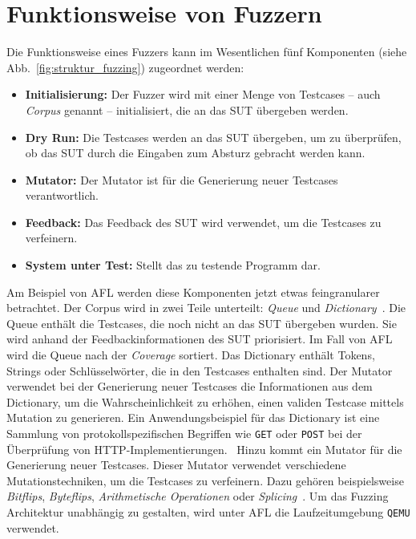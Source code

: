 \section{Funktionsweise von Fuzzern}\label{sec:funktionsweise}
Die Funktionsweise eines Fuzzers kann im Wesentlichen fünf Komponenten (siehe Abb.~\ref{fig:struktur_fuzzing}) zugeordnet werden:
\begin{itemize}
    \item \textbf{Initialisierung:} Der Fuzzer wird mit einer Menge von Testcases -- auch \textit{Corpus} genannt -- initialisiert, die an das SUT übergeben werden.
    \item \textbf{Dry Run:} Die Testcases werden an das SUT übergeben, um zu überprüfen, ob das SUT durch die Eingaben zum
        Absturz gebracht werden kann.
    \item \textbf{Mutator:} Der Mutator ist für die Generierung neuer Testcases verantwortlich.
    \item \textbf{Feedback:} Das Feedback des SUT wird verwendet, um die Testcases zu verfeinern.
    \item \textbf{System unter Test:} Stellt das zu testende Programm dar.
\end{itemize}
Am Beispiel von AFL werden diese Komponenten jetzt etwas feingranularer betrachtet.
Der Corpus wird in zwei Teile unterteilt: \textit{Queue} und \textit{Dictionary}~\cite{afl_whitepaper}.
Die Queue enthält die Testcases, die noch nicht an das SUT übergeben wurden.
Sie wird anhand der Feedbackinformationen des SUT priorisiert.
Im Fall von AFL wird die Queue nach der \textit{Coverage} sortiert.
Das Dictionary enthält Tokens, Strings oder Schlüsselwörter, die in den Testcases enthalten sind.
Der Mutator verwendet bei der Generierung neuer Testcases die Informationen aus dem Dictionary, um die Wahrscheinlichkeit
zu erhöhen, einen validen Testcase mittels Mutation zu generieren.
Ein Anwendungsbeispiel für das Dictionary ist eine Sammlung von protokollspezifischen Begriffen wie \texttt{GET} oder
\texttt{POST} bei der Überprüfung von HTTP-Implementierungen.~\newline
Hinzu kommt ein Mutator für die Generierung neuer Testcases.
Dieser Mutator verwendet verschiedene Mutationstechniken, um die Testcases zu verfeinern.
Dazu gehören beispielsweise \textit{Bitflips}, \textit{Byteflips}, \textit{Arithmetische Operationen} oder
\textit{Splicing}~\cite{afl_whitepaper}.\newline
Um das Fuzzing Architektur unabhängig zu gestalten, wird unter AFL die Laufzeitumgebung \texttt{QEMU} verwendet.

